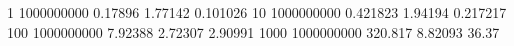 1 1000000000 0.17896 1.77142 0.101026
10 1000000000 0.421823 1.94194 0.217217
100 1000000000 7.92388 2.72307 2.90991
1000 1000000000 320.817 8.82093 36.37
